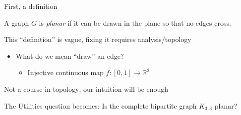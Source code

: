 \documentclass{beamer}
\begin{document}
\begin{frame}{First, a definition}
  \begin{definition}A graph $G$ is \emph{planar} if it can be drawn in the plane so that no edges cross.
  \end{definition}

  \begin{block}{This ``definition'' is vague, fixing it requires analysis/topology}
    \begin{itemize}
    \item What do we mean ``draw'' an edge? 
      \begin{itemize}
        \item Injective continuous map $f:[0,1]\to\mathbb{R}^2$
        \end{itemize}
      \end{itemize}
    \end{block}
  \begin{block}{Not a course in topology; our intuition will be enough}
    \end{block}

  
  
\begin{block}{The Utilities question becomes:} Is the complete bipartite graph $K_{3,3}$ planar?
\end{block}
  


  \end{frame}
\end{document}
